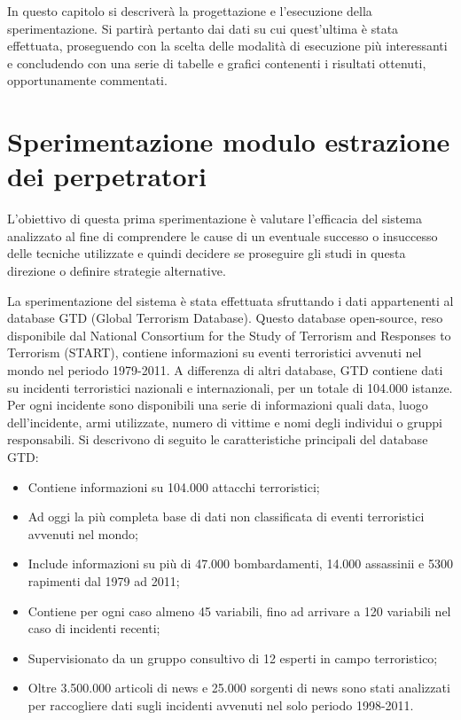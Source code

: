

In questo capitolo si descriverà la progettazione e l'esecuzione della sperimentazione. Si partirà pertanto dai dati su cui quest'ultima è stata effettuata, proseguendo con la scelta delle modalità di esecuzione più interessanti e concludendo con una serie di tabelle e grafici contenenti i risultati ottenuti, opportunamente commentati.  
\section{Sperimentazione modulo estrazione dei perpetratori}
L'obiettivo di questa prima sperimentazione è valutare l'efficacia del sistema analizzato al fine di comprendere le cause di un eventuale successo o insuccesso delle tecniche utilizzate e quindi decidere se proseguire gli studi in questa direzione o definire strategie alternative.

La sperimentazione del sistema è stata effettuata sfruttando i dati appartenenti al database GTD (Global Terrorism Database)\cite{GTD}.
Questo database open-source, reso disponibile dal National Consortium for the Study of Terrorism and Responses to Terrorism (START), contiene informazioni su eventi terroristici avvenuti nel mondo nel periodo 1979-2011. A differenza di altri database, GTD contiene dati su incidenti terroristici nazionali e internazionali, per un totale di 104.000 istanze. Per ogni incidente sono disponibili una serie di informazioni quali data, luogo dell'incidente, armi utilizzate, numero di vittime e nomi degli individui o gruppi responsabili.
Si descrivono di seguito le caratteristiche principali del database GTD:
\begin{itemize}
	\item Contiene informazioni su 104.000 attacchi terroristici;
	\item Ad oggi la più completa base di dati non classificata di eventi terroristici avvenuti nel mondo;
	\item Include informazioni su più di 47.000 bombardamenti, 14.000 assassinii e 5300 rapimenti dal 1979 ad 2011;
	\item Contiene per ogni caso almeno 45 variabili, fino ad arrivare a 120 variabili nel caso di incidenti recenti;
	\item Supervisionato da un gruppo consultivo di 12 esperti in campo terroristico;
	\item Oltre 3.500.000 articoli di news e 25.000 sorgenti di news sono stati analizzati per raccogliere dati sugli incidenti avvenuti nel solo periodo 1998-2011.
\end{itemize}

